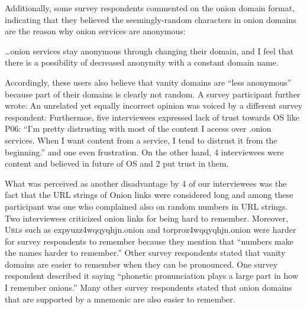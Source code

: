 
Additionally, some survey respondents commented on the onion domain format,
indicating that they believed the seemingly-random characters in onion domains
are the reason why onion services are anonymous:

\begin{displayquote}
\ldots onion services stay anonymous through changing their domain, and I
feel that there is a possibility of decreased anonymity with a constant domain
name.
\end{displayquote}

Accordingly, these users also believe that vanity domains are ``less anonymous''
because part of their domains is clearly not random.  A survey participant
further wrote:   An unrelated yet
equally incorrect opinion was voiced by a different survey respondent:
 Furthermoe,
five interviewees expressed lack of trust towards OS like P06: ``I'm pretty
distrusting with most of the content I access over .onion services. When I want
content from a service, I tend to distrust it from the beginning.'' and one even
frustration. On the other hand, 4 interviewees were content and believed in
future of OS and 2 put trust in them.

What was perceived as another disadvantage by 4 of our interviewees was the fact
that the URL strings of Onion links were considered long and among these
participant was one who complained also on random numbers in URL strings. Two
interviewees criticized onion links for being hard to remember. Moreover,
\textsc{Url}s such as expyuzz4wqqyqhjn.onion and torproz4wqqyqhjn.onion were
harder for survey respondents to remember because they mention that ``numbers
make the names harder to remember.''  Other survey respondents stated that
vanity domains are easier to remember when they can be pronounced.  One survey
respondent described it saying  ``phonetic pronunciation
plays a large part in how I remember onions.'' Many other survey 
respondents stated that onion domains that are supported by a mnemonic are also
easier to remember.

